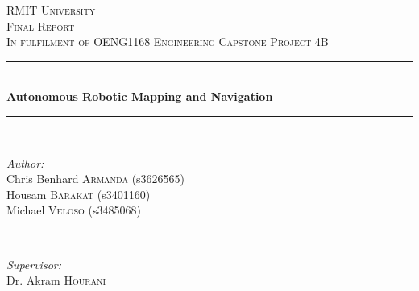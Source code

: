 \documentclass[12pt]{report}
\begin{document}
\begin{titlepage}
\newcommand{\HRule}{\rule{\linewidth}{0.5mm}} %

\center %
 

\textsc{\LARGE RMIT University}\\[1.5cm] %
\textsc{\Large Final Report}\\[0.5cm] %
\textsc{\large In fulfilment of OENG1168 Engineering Capstone Project 4B}\\[0.5cm] %


\HRule \\[0.4cm]
{ \huge \bfseries Autonomous Robotic Mapping and Navigation}\\[0.25cm] %
\HRule \\[1.25cm]
 

\begin{minipage}{0.4\textwidth}
\begin{flushleft} \large
\emph{Author:}\\
Chris Benhard \textsc{Armanda} (s3626565)\\ %
Housam \textsc{Barakat} (s3401160)\\
Michael \textsc{Veloso} (s3485068)
\end{flushleft}
\end{minipage}
~
\begin{minipage}{0.4\textwidth}
\begin{flushright} \large
\emph{Supervisor:} \\
Dr. Akram \textsc{Hourani}\\
\textsc{ } \\
\textsc{ } %
 
\end{flushright}
\end{minipage}\\[1cm]

\end{titlepage}
\end{document}
